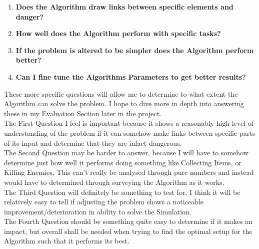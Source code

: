 \begin{flushleft}
            \begin{enumerate}
                \item \textbf{Does the Algorithm draw links between specific elements and danger?}
                \item \textbf{How well does the Algorithm perform with specific tasks?}
                \item \textbf{If the problem is altered to be simpler does the Algorithm perform better?}
                \item \textbf{Can I fine tune the Algorithms Parameters to get better results?}
            \end{enumerate}

            These more specific questions will allow me to determine to what extent the Algorithm can solve the problem.
            I hope to dive more in depth into answering these in my Evaluation Section later in the project. \\
            \vspace{0.2cm}
            The First Question I feel is important because it shows a reasonably high level of understanding of the problem
            if it can somehow make links between specific parts of its input and determine that they are infact dangerous. \\
            \vspace{0.2cm}
            The Second Question may be harder to answer, because I will have to somehow determine just how well it 
            performs doing something like Collecting Items, or Killing Enemies. This can't really be analysed through
            pure numbers and instead would have to determined through surveying the Algorithm as it works. \\
            \vspace{0.2cm}
            The Third Question will definitely be something to test for, I think it will be relatively easy to tell if
            adjusting the problem shows a noticeable improvement/deterioration in ability to solve the Simulation. \\
            \vspace{0.2cm}
            The Fourth Question should be something quite easy to determine if it makes an impact, but overall shall
            be needed when trying to find the optimal setup for the Algorithm such that it performs its best. \\

\end{flushleft}
